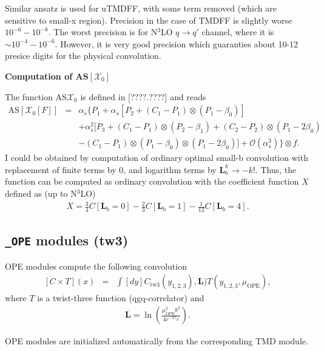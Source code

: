 \documentclass[prd,nofootinbib,eqsecnum,final]{revtex4}
\newcommand{\nn}{\nonumber}
\renewcommand{\(}{\left(}
\renewcommand{\)}{\right)}
\renewcommand{\[}{\left[}
\renewcommand{\]}{\right]}
\begin{document}
Similar ansatz is used for uTMDFF, with some term removed (which are sensitive to small-x region). Precision in the case of TMDFF is slightly worse $10^{-6}-10^{-8}$. The worst precision is for N$^3$LO $q\to q'$ channel, where it is $\sim 10^{-4}-10^{-6}$. However, it is very good precision which guaranties about 10-12 presice digits for the physical convolution.

\begin{center}
\textbf{Computation of AS$[\mathcal{X}_0]$}
\end{center}

The function AS$\mathcal{X}_0$ is defined in [????.????] and reads
\begin{eqnarray}\label{def:AS_X0}
\text{AS}[\mathcal{X}_0[F]]&=&\alpha_s \Big\{P_1+\alpha_s\[P_2+\(C_1-P_1\)\otimes\(P_1-\beta_0\)\]
\\\nn &&+\alpha_s^2\Big[P_3+\(C_1-P_1\)\otimes\(P_2-\beta_1\)
+\(C_2-P_2\)\otimes\(P_1-2\beta_0\)
\\\nn &&-\(C_1-P_1\)\otimes\(P_1-\beta_0\)\otimes\(P_1-2\beta_0\)\Big]
+\mathcal{O}\(\alpha_s^3\)\Big\}\otimes f.
\end{eqnarray}
I could be obtained by computation of ordinary optimal small-b convolution with replacement of finite terms by $0$, and logarithm terms by $\mathbf{L}_b^k\to -k!$. Thus, the function can be computed as ordinary convolution with the coefficient function $X$ defined as (up to N$^3$LO)
\begin{eqnarray}
X=\frac{3}{4}C[\mathbf{L}_b=0]-\frac{2}{3}C[\mathbf{L}_b=1]-\frac{1}{12}C[\mathbf{L}_b=4].
\end{eqnarray}



\subsection{\texttt{\_OPE} modules (tw3)}
\label{TMD_OPE_tw3}

OPE modules compute the following convolution
\begin{eqnarray}\label{OPE:tw3:main}
[C\times T](x)&=&\int [dy] C_{\text{tw3}}(y_{1,2,3}),\mathbf{L})T\(y_{1,2,3},\mu_{\text{OPE}}\),
\end{eqnarray}
where $T$ is a twist-three function (qgq-correlator) and
\begin{eqnarray}
\mathbf{L}=\ln\(\frac{\mu^2_{\text{OPE}}b^2}{4e^{-2\gamma_E}}\).
\end{eqnarray}

\begin{tcolorbox}
\begin{center}
OPE modules are initialized automatically from the corresponding TMD module.
\end{center}
\end{tcolorbox}
\end{document}
